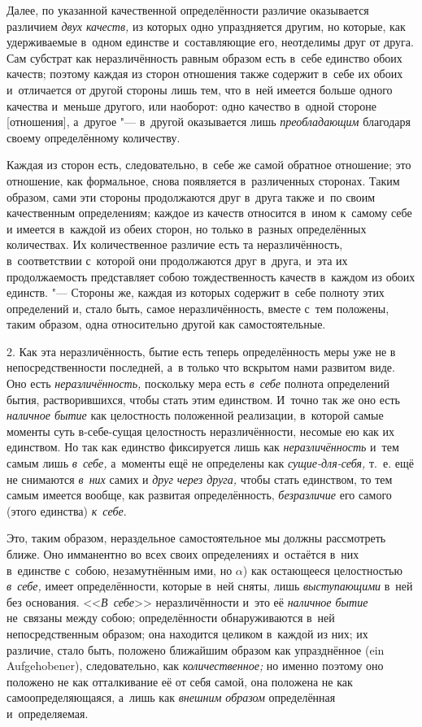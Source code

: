 Далее, по указанной качественной определённости различие оказывается различием
{\em двух качеств,} из которых одно упраздняется другим, но которые, как
удерживаемые в~одном единстве и~составляющие его, неотделимы друг от друга. Сам
субстрат как неразличённость равным образом есть в~себе единство обоих качеств;
поэтому каждая из сторон отношения также содержит в~себе их обоих и~отличается
от другой стороны лишь тем, что в~ней имеется больше одного качества и~меньше
другого, или наоборот: одно качество в~одной стороне [отношения], а~другое "--- в~другой
оказывается лишь {\em преобладающим} благодаря своему определённому количеству.

Каждая из сторон есть, следовательно, в~себе же самой обратное отношение; это
отношение, как формальное, снова появляется в~различенных сторонах. Таким
образом, сами эти стороны продолжаются друг в~друга также и~по своим
качественным определениям; каждое из качеств относится в~ином к~самому себе и
имеется в~каждой из обеих сторон, но только в~разных определённых количествах.
Их количественное различие есть та неразличённость, в~соответствии с~которой
они продолжаются друг в~друга, и~эта их продолжаемость представляет собою
тождественность качеств в~каждом из обоих единств. "--- Стороны же, каждая из
которых содержит в~себе полноту этих определений и, стало быть, самое
неразличённость, вместе с~тем положены, таким образом, одна относительно
другой как самостоятельные.

2. Как эта неразличённость, бытие есть теперь определённость меры уже не в
непосредственности последней, а~в только что вскрытом нами развитом виде. Оно
есть {\em неразличённость,} поскольку мера есть {\em в~себе} полнота
определений бытия, растворившихся, чтобы стать этим единством. И~точно так же
оно есть {\em наличное бытие} как целостность положенной реализации, в~которой
самые моменты суть в-себе-сущая целостность неразличённости, несомые ею как их
единством. Но так как единство фиксируется лишь как {\em неразличённость} и~тем
самым лишь {\em в~себе,} а~моменты ещё не определены как {\em сущие-для-себя,}
т.~е. ещё не снимаются {\em в~них} самих и {\em друг через друга,} чтобы стать
единством, то тем самым имеется вообще, как развитая определённость, {\em
безразличие} его самого (этого единства) {\em к~себе}.

Это, таким образом, нераздельное самостоятельное мы должны рассмотреть ближе.
Оно имманентно во всех своих определениях и~остаётся в~них в~единстве с~собою,
незамутнённым ими, но $\alpha$) как остающееся целостностью {\em в~себе,} имеет
определённости, которые в~ней сняты, лишь {\em выступающими} в~ней без
основания. <<{\em В~себе}>> неразличённости и~это её {\em наличное бытие}
не~связаны между собою; определённости обнаруживаются в~ней непосредственным
образом; она находится целиком в~каждой из них; их различие, стало быть,
положено ближайшим образом как упразднённое (ein Auf\-ge\-ho\-be\-ner),
следовательно, как {\em количественное;} но именно поэтому оно положено не как
отталкивание её от себя самой, она положена не как самоопределяющаяся, а~лишь
как {\em внешним образом} определённая и~определяемая.

